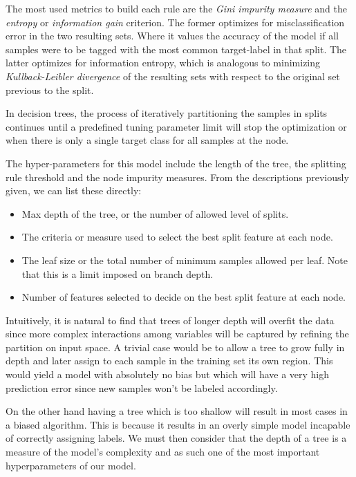 The most used metrics to build each rule are the \textit{Gini impurity measure} and the \textit{entropy} or \textit{information gain} criterion. The former optimizes for misclassification error in the two resulting sets. Where it values the accuracy of the model if all samples were to be tagged with the most common target-label in that split. The latter optimizes for information entropy, which is analogous to minimizing \textit{Kullback-Leibler divergence} of the resulting sets with respect to the original set previous to the split.

In decision trees, the process of iteratively partitioning the samples in splits continues until a predefined tuning parameter limit will stop the optimization or when there is only a single target class for all samples at the node.

The hyper-parameters for this model include the length of the tree, the splitting rule threshold and the node impurity measures. From the descriptions previously given, we can list these directly:

\begin{itemize}
\item Max depth of the tree, or the number of allowed level of splits.
\item The criteria or measure used to select the best split feature at each node.
\item The leaf size or the total number of minimum samples allowed per leaf. Note that this is a limit imposed on branch depth.
\item Number of features selected to decide on the best split feature at each node.
\end{itemize}



Intuitively, it is natural to find that trees of longer depth will overfit the data since more complex interactions among variables will be captured by refining the partition on input space. A trivial case would be to allow a tree to grow fully in depth and later assign to each sample in the training set its own region. This would yield a model with absolutely no bias but which will have a very high prediction error since new samples won't be labeled accordingly.


On the other hand having a tree which is too shallow will result in most cases in a biased algorithm. This is because it results in an overly simple model incapable of correctly assigning labels. We must then consider that the depth of a tree is a measure of the model's complexity and as such one of the most important hyperparameters of our model.

